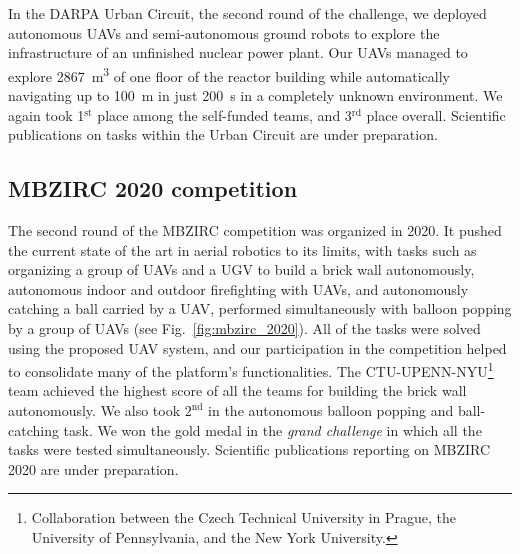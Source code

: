 \documentclass[a4paper,11pt,titlepage,twoside]{book}
\newcommand{\reffig}[1]{Fig.~\ref{#1}}
\begin{document}

In the \ac{DARPA} Urban Circuit, the second round of the challenge, we deployed autonomous \acp{UAV} and semi-autonomous ground robots to explore the infrastructure of an unfinished nuclear power plant.
Our \acp{UAV} managed to explore \SI{2867}{\meter\cubed} of one floor of the reactor building while automatically navigating up to \SI{100}{\meter} in just \SI{200}{\second} in a completely unknown environment.
We again took 1$^{\text{st}}$ place among the self-funded teams, and 3$^{\text{rd}}$ place overall.
Scientific publications on tasks within the Urban Circuit are under preparation.

\subsection{MBZIRC 2020 competition}

The second round of the \ac{MBZIRC} competition was organized in 2020.
It pushed the current state of the art in aerial robotics to its limits, with tasks such as organizing a group of \acp{UAV} and a \ac{UGV} to build a brick wall autonomously, autonomous indoor and outdoor firefighting with \acp{UAV}, and autonomously catching a ball carried by a \ac{UAV}, performed simultaneously with balloon popping by a group of \acp{UAV} (see \reffig{fig:mbzirc_2020}).
All of the tasks were solved using the proposed \ac{UAV} system, and our participation in the competition helped to consolidate many of the platform's functionalities.
The CTU-UPENN-NYU\footnote{Collaboration between the Czech Technical University in Prague, the University of Pennsylvania, and the New York University.} team achieved the highest score of all the teams for building the brick wall autonomously.
We also took $2^{\text{nd}}$ in the autonomous balloon popping and ball-catching task.
We won the gold medal in the \emph{grand challenge} in which all the tasks were tested simultaneously.
Scientific publications reporting on \ac{MBZIRC} 2020 are under preparation.

\end{document}
